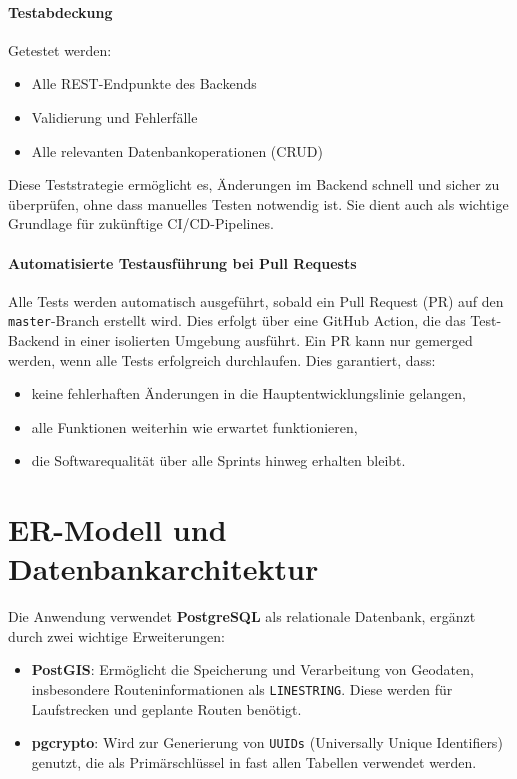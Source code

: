 \documentclass[11pt,a4paper]{article}
\begin{document}
\paragraph{Testabdeckung}
Getestet werden:
\begin{itemize}
    \item Alle REST-Endpunkte des Backends
    \item Validierung und Fehlerfälle
    \item Alle relevanten Datenbankoperationen (CRUD)
\end{itemize}

Diese Teststrategie ermöglicht es, Änderungen im Backend schnell und sicher zu überprüfen, ohne dass manuelles Testen notwendig ist. Sie dient auch als wichtige Grundlage für zukünftige CI/CD-Pipelines.

\paragraph{Automatisierte Testausführung bei Pull Requests}
Alle Tests werden automatisch ausgeführt, sobald ein Pull Request (PR) auf den \texttt{master}-Branch erstellt wird. Dies erfolgt über eine GitHub Action, die das Test-Backend in einer isolierten Umgebung ausführt. Ein PR kann nur gemerged werden, wenn alle Tests erfolgreich durchlaufen. Dies garantiert, dass:
\begin{itemize}
    \item keine fehlerhaften Änderungen in die Hauptentwicklungslinie gelangen,
    \item alle Funktionen weiterhin wie erwartet funktionieren,
    \item die Softwarequalität über alle Sprints hinweg erhalten bleibt.
\end{itemize}


\section{ER-Modell und Datenbankarchitektur}

Die Anwendung verwendet \textbf{PostgreSQL} als relationale Datenbank, ergänzt durch zwei wichtige Erweiterungen:

\begin{itemize}
    \item \textbf{PostGIS}: Ermöglicht die Speicherung und Verarbeitung von Geodaten, insbesondere Routeninformationen als \texttt{LINESTRING}. Diese werden für Laufstrecken und geplante Routen benötigt.
    \item \textbf{pgcrypto}: Wird zur Generierung von \texttt{UUIDs} (Universally Unique Identifiers) genutzt, die als Primärschlüssel in fast allen Tabellen verwendet werden.
\end{itemize}
\end{document}
